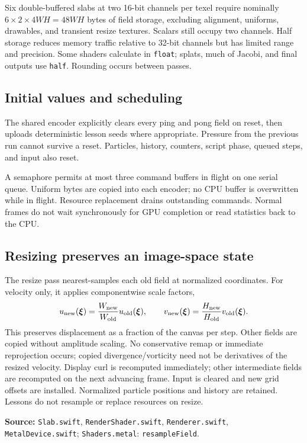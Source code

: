 \documentclass[11pt,a4paper]{article}
\newcommand{\src}[1]{\par{\footnotesize\raggedright\color{teal}\textbf{Source:} #1\par}}
\newcommand{\code}[1]{\texttt{#1}}
\begin{document}
Six double-buffered slabs at two 16-bit channels per texel require nominally
$6\times2\times4WH=48WH$ bytes of field storage, excluding alignment, uniforms,
drawables, and transient resize textures. Scalars still occupy two channels.
Half storage reduces memory traffic relative to 32-bit channels but has limited
range and precision. Some shaders calculate in \code{float}; splats, much of
Jacobi, and final outputs use \code{half}. Rounding occurs between passes.

\subsection*{Initial values and scheduling}
The shared encoder explicitly clears every ping and pong field on reset, then uploads deterministic lesson seeds where appropriate. Pressure from the previous run cannot survive a reset. Particles, history, counters, script phase, queued steps, and input also reset.

A semaphore permits at most three command buffers in flight on one serial queue. Uniform bytes are copied into each encoder; no CPU buffer is overwritten while in flight. Resource replacement drains outstanding commands. Normal frames do not wait synchronously for GPU completion or read statistics back to the CPU.

\subsection*{Resizing preserves an image-space state}
The resize pass nearest-samples each old field at normalized coordinates. For
velocity only, it applies componentwise scale factors,
\begin{equation}
 u_{\rm new}(\boldsymbol\xi)=\frac{W_{\rm new}}{W_{\rm old}}
 u_{\rm old}(\boldsymbol\xi),\qquad
 v_{\rm new}(\boldsymbol\xi)=\frac{H_{\rm new}}{H_{\rm old}}
 v_{\rm old}(\boldsymbol\xi).
\end{equation}
This preserves displacement as a fraction of the canvas per step. Other fields
are copied without amplitude scaling. No conservative remap or immediate
reprojection occurs; copied divergence/vorticity need not be derivatives of the
resized velocity. Display curl is recomputed immediately; other intermediate fields are recomputed on the next advancing frame. Input is cleared and new grid offsets are installed. Normalized particle positions and history are retained. Lessons do not resample or replace resources on resize.
\src{\code{Slab.swift}, \code{RenderShader.swift}, \code{Renderer.swift},
\code{MetalDevice.swift}; \code{Shaders.metal}: \code{resampleField}.}
\end{document}
